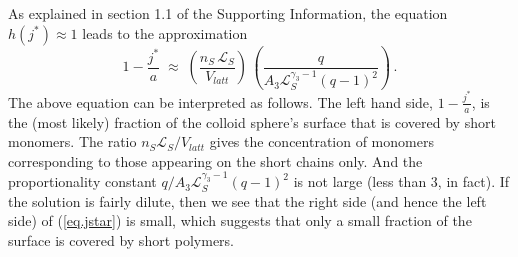 \documentclass[journal=mamobx,manuscript=article]{achemso}
\newcommand{\leng}{\mathcal{L}}
\begin{document}


As explained in section 1.1 of the Supporting Information, the equation
$h(j^*)\approx 1$ leads to the approximation
\begin{equation}
    \label{eq.jstar}
     1-\frac{j^*}{a}     \; \approx   \; 
        \left(  \frac{n_S\,\leng_S}{V_{latt} }\right) \,\left(   \frac{q}{A_3\leng_S^{\gamma_3-1}(q-1)^2}\right)  \,.
\end{equation}
The above equation can be interpreted as follows.  The left hand side, $1-\frac{j^*}{a}$, is the (most likely) fraction of the colloid sphere's surface that is covered by short monomers.  
The ratio $n_S\leng_S/V_{latt}$ gives
the concentration of monomers corresponding to those appearing on the short chains only.
And the proportionality constant $q/A_3\leng_S^{\gamma_3-1}(q-1)^2$ is not large (less than 3, in fact).
If the solution is fairly dilute, then we see that the right side (and hence the left side) of (\ref{eq.jstar}) is small, which suggests
that only a small fraction of the surface is covered by short polymers.


\end{document}
